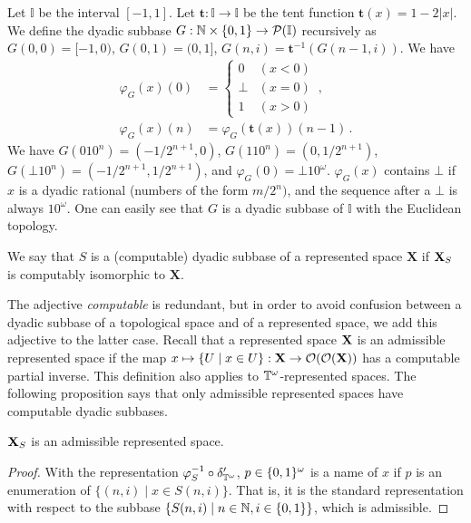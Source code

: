 \documentclass{eptcs-modified}
\begin{document}
\newcommand{\I}{{\mathbb I}}
\begin{example}\label{ex:gray} Let $\I$ be the interval $[-1, 1]$.  Let $\mathbf t: \I \to \I$ be the tent function
${\mathbf t}(x) = 1- 2|x|$.
We define  the dyadic subbase $G: \N \times \2 \to \cal{P}(\I)$ recursively as $G(0,0) = [-1, 0)$, $G(0,1) = (0, 1]$,
$G(n, i) = {\mathbf t}^{-1}(G(n-1, i))$.  We have
\begin{align*}
\varphi_G(x)(0) &= \left \{\begin{array}{ll}0 & (x < 0)\\
                              \bot & (x = 0)\\
                               1   &  (x > 0)\end{array}\,,\right .\\
\varphi_G(x)(n) &= \varphi_G({\mathbf t}(x))(n-1)\,.
\end{align*}
We have
$G(010^n) = (-1/2^{n+1},0)$,  $G(110^n) = (0, 1/2^{n+1})$,
$G(\bot 10^n) = (-1/2^{n+1}, 1/2^{n+1})$, and $\varphi_G(0) = \bot 1 0^{\omega}$.
$\varphi_G(x)$ contains $\bot$ if $x$ is a dyadic rational (numbers of the form $m/2^n)$, and the sequence after a $\bot$ is always $10^\omega$.
One can easily see that $G$ is a dyadic subbase of $\I$ with the Euclidean topology.

\end{example}




\begin{definition}\label{def:dyadicsubbase3}
We say that $S$ is a (computable) dyadic subbase of a represented space $\mathbf{X}$ if
$\mathbf{X}_S$ is computably isomorphic to $\mathbf{X}$.
\end{definition}

The adjective \emph{computable} is redundant, but in order to avoid confusion between a dyadic subbase of a topological space and of a represented space, we add this adjective to the latter case.
Recall that a represented space $\mathbf{X}$ is an admissible represented space if
the map $x \mapsto \{U \mid x \in U\} : \mathbf{X} \to \mathcal{O}(\mathcal{O}(\mathbf{X}))$ has a computable partial inverse.
This definition also applies to $\mathbb{T}^\omega$-represented spaces.
The following proposition says that only admissible represented spaces have computable dyadic subbases.


\begin{proposition}
  $\mathbf{X}_S$ is an admissible represented space.
\end{proposition}
\begin{proof}
  With the representation $\varphi^{-1}_S \circ \delta'_{\mathbb{T}^\omega}$,
$p \in \{0,1\}^\omega$ is a name of $x$ if $p$ is an enumeration of $\{(n,i) \mid x \in S(n,i)\}$.
That is, it is the standard representation with respect to the subbase
$\{S(n,i) \mid n \in \mathbb{N}, i \in \{0,1\} \}$, which is admissible.
\end{proof}
\end{document}
